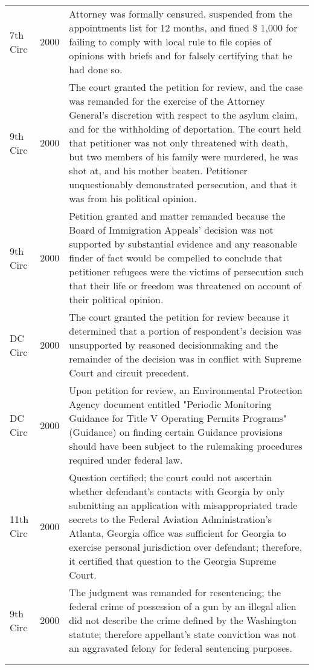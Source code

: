 \documentclass[10pt, letterpaper]{article}
\begin{document}
\begin{spacing}{1.0}
\begin{small}
\begin{longtable}[H]{llp{5in}}
    7th Circ & 2000 & Attorney was formally censured, suspended from the appointments list for 12 months, and fined \$ 1,000 for failing to comply with local rule to file copies of opinions with briefs and for falsely certifying that he had done so.\\[4pt]
    9th Circ & 2000 & The court granted the petition for review, and the case was remanded for the exercise of the Attorney General's discretion with respect to the asylum claim, and for the withholding of deportation. The court held that petitioner was not only threatened with death, but two members of his family were murdered, he was shot at, and his mother beaten. Petitioner unquestionably demonstrated persecution, and that it was from his political opinion.\\[4pt]
    9th Circ & 2000 & Petition granted and matter remanded because the Board of Immigration Appeals' decision was not supported by substantial evidence and any reasonable finder of fact would be compelled to conclude that petitioner refugees were the victims of persecution such that their life or freedom was threatened on account of their political opinion.\\[4pt]
    DC Circ & 2000 & The court granted the petition for review because it determined that a portion of respondent's decision was unsupported by reasoned decisionmaking and the remainder of the decision was in conflict with Supreme Court and circuit precedent.\\[4pt]
    DC Circ & 2000 & Upon petition for review, an Environmental Protection Agency document entitled "Periodic Monitoring Guidance for Title V Operating Permits Programs" (Guidance) on finding certain Guidance provisions should have been subject to the rulemaking procedures required under federal law.\\[4pt]
    11th Circ & 2000 & Question certified; the court could not ascertain whether defendant's contacts with Georgia by only submitting an application with misappropriated trade secrets to the Federal Aviation Administration's Atlanta, Georgia office was sufficient for Georgia to exercise personal jurisdiction over defendant; therefore, it certified that question to the Georgia Supreme Court.\\[4pt]
    9th Circ & 2000 & The judgment was remanded for resentencing; the federal crime of possession of a gun by an illegal alien did not describe the crime defined by the Washington statute; therefore appellant's state conviction was not an aggravated felony for federal sentencing purposes.\\[4pt]
    \hline\\
    \label{tab:outcomeTypeOtherNonDismiss}
\end{longtable}
\end{small}


\end{spacing}
\end{document}
